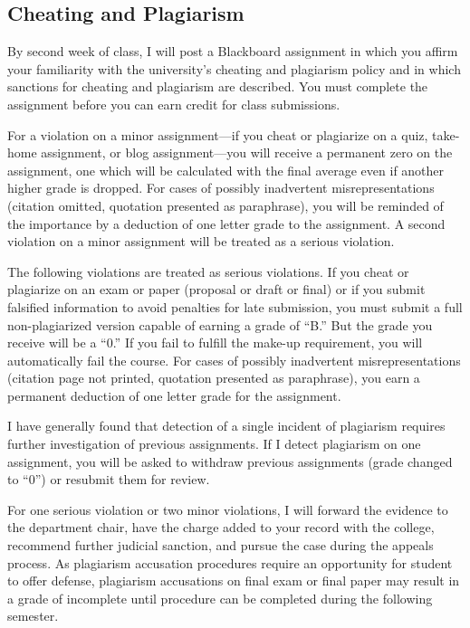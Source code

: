 \documentclass[]{article}
\begin{document}
\subsection{Cheating and Plagiarism}\label{cheating-and-plagiarism}

By second week of class, I will post a Blackboard assignment in which
you affirm your familiarity with the university's cheating and
plagiarism policy and in which sanctions for cheating and plagiarism are
described. You must complete the assignment before you can earn credit
for class submissions.

For a violation on a minor assignment---if you cheat or plagiarize on a
quiz, take-home assignment, or blog assignment---you will receive a
permanent zero on the assignment, one which will be calculated with the
final average even if another higher grade is dropped. For cases of
possibly inadvertent misrepresentations (citation omitted, quotation
presented as paraphrase), you will be reminded of the importance by a
deduction of one letter grade to the assignment. A second violation on a
minor assignment will be treated as a serious violation.

The following violations are treated as serious violations. If you cheat
or plagiarize on an exam or paper (proposal or draft or final) or if you
submit falsified information to avoid penalties for late submission, you
must submit a full non-plagiarized version capable of earning a grade of
``B.'' But the grade you receive will be a ``0.'' If you fail to fulfill
the make-up requirement, you will automatically fail the course. For
cases of possibly inadvertent misrepresentations (citation page not
printed, quotation presented as paraphrase), you earn a permanent
deduction of one letter grade for the assignment.

I have generally found that detection of a single incident of plagiarism
requires further investigation of previous assignments. If I detect
plagiarism on one assignment, you will be asked to withdraw previous
assignments (grade changed to ``0'') or resubmit them for review.

For one serious violation or two minor violations, I will forward the
evidence to the department chair, have the charge added to your record
with the college, recommend further judicial sanction, and pursue the
case during the appeals process. As plagiarism accusation procedures
require an opportunity for student to offer defense, plagiarism
accusations on final exam or final paper may result in a grade of
incomplete until procedure can be completed during the following
semester.
\end{document}
